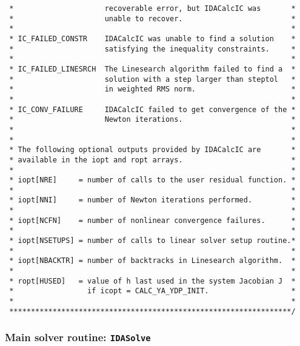 \documentclass[11pt]{article}
\begin{document}
\begin{verbatim}
 *                     recoverable error, but IDACalcIC was       *
 *                     unable to recover.                         *
 *                                                                *
 * IC_FAILED_CONSTR    IDACalcIC was unable to find a solution    *
 *                     satisfying the inequality constraints.     *
 *                                                                *
 * IC_FAILED_LINESRCH  The Linesearch algorithm failed to find a  *
 *                     solution with a step larger than steptol   *
 *                     in weighted RMS norm.                      *
 *                                                                *
 * IC_CONV_FAILURE     IDACalcIC failed to get convergence of the *
 *                     Newton iterations.                         *
 *                                                                *
 *                                                                *
 * The following optional outputs provided by IDACalcIC are       *
 * available in the iopt and ropt arrays.                         *
 *                                                                *
 * iopt[NRE]     = number of calls to the user residual function. *
 *                                                                *
 * iopt[NNI]     = number of Newton iterations performed.         *
 *                                                                *
 * iopt[NCFN]    = number of nonlinear convergence failures.      *
 *                                                                *
 * iopt[NSETUPS] = number of calls to linear solver setup routine.*
 *                                                                *
 * iopt[NBACKTR] = number of backtracks in Linesearch algorithm.  *
 *                                                                *
 * ropt[HUSED]   = value of h last used in the system Jacobian J  *
 *                 if icopt = CALC_YA_YDP_INIT.                   *
 *                                                                *
 *****************************************************************/

\end{verbatim}
\normalsize


\subsubsection{Main solver routine: {\tt IDASolve}}
\end{document}
